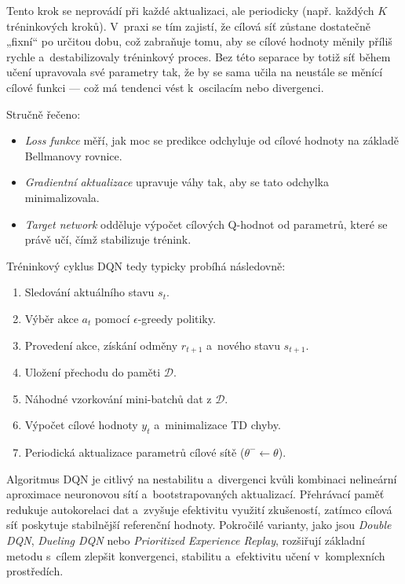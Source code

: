 Tento krok se neprovádí při každé aktualizaci, ale periodicky (např. každých \(K\) tréninkových kroků). V~praxi se tím zajistí, že cílová síť zůstane dostatečně „fixní“ po určitou dobu, což zabraňuje tomu, aby se cílové hodnoty měnily příliš rychle a~destabilizovaly tréninkový proces. Bez této separace by totiž síť během učení upravovala své parametry tak, že by se sama učila na neustále se měnící cílové funkci — což má tendenci vést k~oscilacím nebo divergenci.

Stručně řečeno:
\begin{itemize}
    \item \textit{Loss funkce} měří, jak moc se predikce odchyluje od cílové hodnoty na základě Bellmanovy rovnice.
    \item \textit{Gradientní aktualizace} upravuje váhy tak, aby se tato odchylka minimalizovala.
    \item \textit{Target network} odděluje výpočet cílových Q-hodnot od parametrů, které se právě učí, čímž stabilizuje trénink.
\end{itemize}

Tréninkový cyklus DQN tedy typicky probíhá následovně:

\begin{enumerate}
    \item Sledování aktuálního stavu \(s_t\).
    \item Výběr akce \(a_t\) pomocí \(\epsilon\)-greedy politiky.
    \item Provedení akce, získání odměny \(r_{t+1}\) a~nového stavu \(s_{t+1}\).
    \item Uložení přechodu do paměti \(\mathcal{D}\).
    \item Náhodné vzorkování mini-batchů dat z \(\mathcal{D}\).
    \item Výpočet cílové hodnoty \(y_t\) a~minimalizace TD chyby.
    \item Periodická aktualizace parametrů cílové sítě (\(\theta^- \leftarrow \theta\)).
\end{enumerate}

Algoritmus DQN je citlivý na nestabilitu a~divergenci kvůli kombinaci nelineární aproximace neuronovou sítí a~bootstrapovaných aktualizací. Přehrávací paměť redukuje autokorelaci dat a~zvyšuje efektivitu využití zkušeností, zatímco cílová síť poskytuje stabilnější referenční hodnoty. Pokročilé varianty, jako jsou \textit{Double DQN}, \textit{Dueling DQN} nebo \textit{Prioritized Experience Replay}, rozšiřují základní metodu s~cílem zlepšit konvergenci, stabilitu a~efektivitu učení v~komplexních prostředích.

